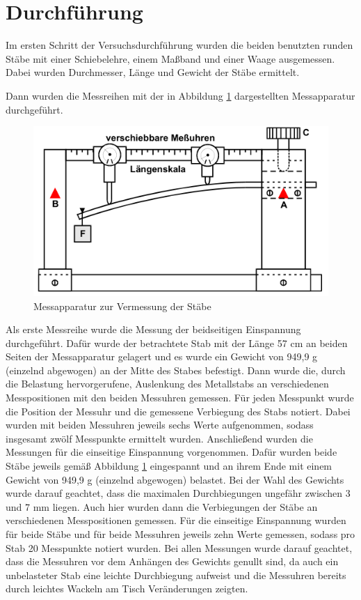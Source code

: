 \section{Durchführung}
\label{sec:Durchführung}
Im ersten Schritt der Versuchsdurchführung wurden die beiden benutzten runden Stäbe mit einer Schiebelehre, einem Maßband und einer Waage ausgemessen. Dabei wurden Durchmesser, Länge und Gewicht der Stäbe ermittelt.

Dann wurden die Messreihen mit der in Abbildung \ref{fig:messaufbau} dargestellten Messapparatur durchgeführt.
\begin{figure}
	\centering
	\includegraphics{Messaufbau.PNG}
	\caption{Messapparatur zur Vermessung der Stäbe \cite{sample}}
	\label{fig:messaufbau}
\end{figure}
Als erste Messreihe wurde die Messung der beidseitigen Einspannung durchgeführt. Dafür wurde der betrachtete Stab mit der Länge 57 cm an beiden Seiten der Messapparatur gelagert und es wurde ein Gewicht von 949,9 g (einzelnd abgewogen) an der Mitte des Stabes befestigt. Dann wurde die, durch die Belastung hervorgerufene, Auslenkung des Metallstabs an verschiedenen Messpositionen mit den beiden Messuhren gemessen. Für jeden Messpunkt wurde die Position der Messuhr und die gemessene Verbiegung des Stabs notiert. Dabei wurden mit beiden Messuhren jeweils sechs Werte aufgenommen, sodass insgesamt zwölf Messpunkte ermittelt wurden. \newline
Anschließend wurden die Messungen für die einseitige Einspannung vorgenommen. Dafür wurden beide Stäbe jeweils gemäß Abbildung \ref{fig:messaufbau} eingespannt und an ihrem Ende mit einem Gewicht von 949,9 g (einzelnd abgewogen) belastet. Bei der Wahl des Gewichts wurde darauf geachtet, dass die maximalen Durchbiegungen ungefähr zwischen 3 und 7 mm liegen. Auch hier wurden dann die Verbiegungen der Stäbe an verschiedenen Messpositionen gemessen. Für die einseitige Einspannung wurden für beide Stäbe und für beide Messuhren jeweils zehn Werte gemessen, sodass pro Stab 20 Messpunkte notiert wurden.  
Bei allen Messungen wurde darauf geachtet, dass die Messuhren vor dem Anhängen des Gewichts genullt sind, da auch ein unbelasteter Stab eine leichte Durchbiegung aufweist und die Messuhren bereits durch leichtes Wackeln am Tisch Veränderungen zeigten.